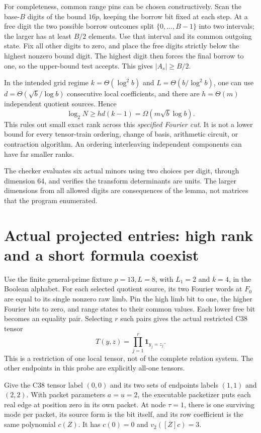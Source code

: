 \documentclass[11pt]{article}
\begin{document}
For completeness, common range pins can be chosen constructively. Scan
the base-$B$ digits of the bound $16p$, keeping the borrow bit fixed at
each step. At a free digit the two possible borrow outcomes split
$\{0,\ldots,B-1\}$ into two intervals; the larger has at least $B/2$
elements. Use that interval and its common outgoing state. Fix all other
digits to zero, and place the free digits strictly below the highest
nonzero bound digit. The highest digit then forces the final borrow to
one, so the upper-bound test accepts. This gives $|A_s|\ge B/2$.

In the intended grid regime $k=\Theta(\log^2 b)$ and
$L=\Theta(b/\log^2b)$, one can use
$d=\Theta(\sqrt b/\log b)$ consecutive local coefficients, and there
are $h=\Theta(m)$ independent quotient sources. Hence
\[
 \log_2N\ge hd(k-1)=\Omega(m\sqrt b\log b).
\]
This rules out small exact rank across this \emph{specified Fourier cut}.
It is not a lower bound for every tensor-train ordering, change of basis,
arithmetic circuit, or contraction algorithm. An ordering interleaving
independent components can have far smaller ranks.

The checker evaluates six actual minors using two choices per digit,
through dimension 64, and verifies the transform determinants are units.
The larger dimensions from all allowed digits are consequences of the
lemma, not matrices that the program enumerated.

\section{Actual projected entries: high rank and a short formula coexist}
Use the finite general-prime fixture $p=13,L=8$, with $L_1=2$ and
$k=4$, in the Boolean alphabet. For each selected quotient source, its
two Fourier words at $F_0$ are equal to its single nonzero raw limb.
Pin the high limb bit to one, the higher Fourier bits to zero, and range
states to their common values. Each lower free bit becomes an equality
pair. Selecting $r$ such pairs gives the actual restricted C38 tensor
\[
 T(y,z)=\prod_{j=1}^{r}\mathbf1_{y_j=z_j}.
\]
This is a restriction of one local tensor, not of the complete relation
system. The other endpoints in this probe are explicitly all-one tensors.

Give the C38 tensor label $(0,0)$ and its two sets of endpoints labels
$(1,1)$ and $(2,2)$. With packet parameters $a=u=2$, the executable
packetizer puts each real edge at position zero in its own packet. At
node $\tau=1$, there is one surviving mode per packet, its source form
is the bit itself, and its row coefficient is the same polynomial $c(Z)$.
It has $c(0)=0$ and $v_2([Z]c)=3$.
\end{document}
